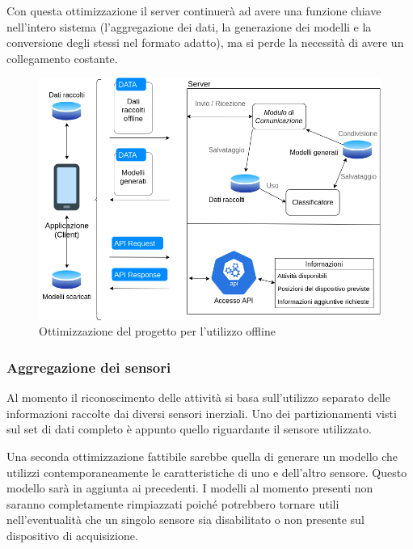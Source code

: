 \vspace{5mm} %
Con questa ottimizzazione il server continuerà ad avere una funzione chiave nell'intero sistema (l'aggregazione dei dati, la 
generazione dei modelli e la conversione degli stessi nel formato adatto), ma si perde la necessità di avere un collegamento costante.

\begin{figure}[H]
    \centering
    \includegraphics[scale = 0.56]{assets/images/future/offline.png}
    \caption{Ottimizzazione del progetto per l'utilizzo offline}
    \label{fig:future_overview}
\end{figure}

\subsubsection{Aggregazione dei sensori}
Al momento il riconoscimento delle attività si basa sull'utilizzo separato delle informazioni raccolte dai diversi sensori inerziali.
Uno dei partizionamenti visti sul set di dati completo è appunto quello riguardante il sensore utilizzato.

\vspace{5mm} %

Una seconda ottimizzazione fattibile sarebbe quella di generare un modello che utilizzi contemporaneamente le caratteristiche di uno e dell'altro sensore.
Questo modello sarà in aggiunta ai precedenti. I modelli al momento presenti non saranno completamente rimpiazzati poiché potrebbero 
tornare utili nell'eventualità che un singolo sensore sia disabilitato o non presente sul dispositivo di acquisizione.